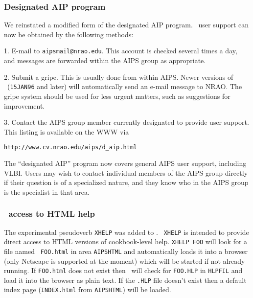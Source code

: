 \subsubsection{Designated AIP program}

We reinstated a modified form of the designated AIP program. \AIPS\
user support can now be obtained by the following methods:
\begin{description}
\vspace{-10pt}

\item{ 1.} {E-mail to {\tt aipsmail@nrao.edu}. This account is checked
several times a day, and messages are forwarded within the AIPS group
as appropriate.}

\item{ 2.} {Submit a gripe. This is usually done from within
AIPS. Newer versions of \AIPS\ ({\tt 15JAN96} and later) will
automatically send an e-mail message to NRAO. The gripe system should
be used for less urgent matters, such as suggestions for improvement.}

\item{ 3.} {Contact the AIPS group member currently designated to
provide user support. This listing is available on the WWW via}

\end{description}
\begin{center}
\vskip -10pt
{\tt http://www.cv.nrao.edu/aips/d\_aip.html}
\vskip -10pt
\end{center}

The ``designated AIP'' program now covers general AIPS user support,
including VLBI. Users may wish to contact individual members of the
AIPS group directly if their question is of a specialized nature, and
they know who in the AIPS group is the specialist in that area.

\subsubsection{\AIPS\ access to HTML help}

The experimental pseudoverb {\tt XHELP} was added to \AIPS. {\tt
XHELP} is intended to provide direct access to HTML versions of
cookbook-level help.  {\tt XHELP FOO} will look for a file named {\tt
FOO.html} in area {\tt AIPSHTML} and automatically loads it into a
browser (only Netscape is supported at the moment) which will be
started if not already running.  If {\tt FOO.html} does not exist then
\AIPS\ will check for {\tt FOO.HLP} in {\tt HLPFIL} and load it into
the browser as plain text.  If the {\tt .HLP} file doesn't exist then
a default index page ({\tt INDEX.html} from {\tt AIPSHTML}) will be
loaded.




